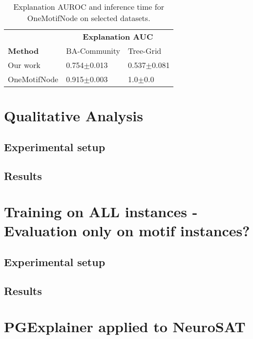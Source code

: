 \begin{table}[ht]
    \centering
    \scriptsize
    \begin{tabularx}{0.6\textwidth}{l*{2}{X}}   %
    \toprule
    \textbf{} & \multicolumn{2}{c}{\textbf{Explanation AUC}} \\
    \cmidrule{2-3}
    \textbf{Method} & BA-Community & Tree-Grid \\
    \midrule
    Our work & 0.754$\pm$0.013 & 0.537$\pm$0.081 \\
    \midrule
    OneMotifNode & 0.915$\pm$0.003 & 1.0$\pm$0.0 \\
    \bottomrule
    \end{tabularx}
    \caption{Explanation AUROC and inference time for OneMotifNode on selected datasets.}
    \label{tab:allmotifnodes_selected}
\end{table}


\section{Qualitative Analysis}

\subsection{Experimental setup}

\subsection{Results}


\section{Training on ALL instances - Evaluation only on motif instances?}

\subsection{Experimental setup}

\subsection{Results}



\section{PGExplainer applied to NeuroSAT}

